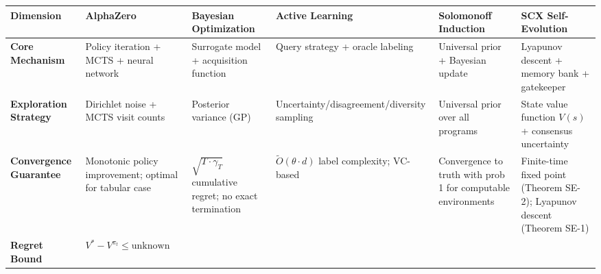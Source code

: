 \documentclass[
  12pt,
]{ctexart}
\begin{document}
\begin{longtable}[]{@{}
  >{\raggedright\arraybackslash}p{}
  >{\raggedright\arraybackslash}p{}
  >{\raggedright\arraybackslash}p{}
  >{\raggedright\arraybackslash}p{}
  >{\raggedright\arraybackslash}p{}
  >{\raggedright\arraybackslash}p{}@{}}
\toprule\noalign{}
\begin{minipage}[b]{\linewidth}\raggedright
Dimension
\end{minipage} & \begin{minipage}[b]{\linewidth}\raggedright
AlphaZero
\end{minipage} & \begin{minipage}[b]{\linewidth}\raggedright
Bayesian Optimization
\end{minipage} & \begin{minipage}[b]{\linewidth}\raggedright
Active Learning
\end{minipage} & \begin{minipage}[b]{\linewidth}\raggedright
Solomonoff Induction
\end{minipage} & \begin{minipage}[b]{\linewidth}\raggedright
SCX Self-Evolution
\end{minipage} \\
\midrule\noalign{}
\endhead
\bottomrule\noalign{}
\endlastfoot
\textbf{Core Mechanism} & Policy iteration + MCTS + neural network &
Surrogate model + acquisition function & Query strategy + oracle
labeling & Universal prior + Bayesian update & Lyapunov descent + memory
bank + gatekeeper \\
\textbf{Exploration Strategy} & Dirichlet noise + MCTS visit counts &
Posterior variance (GP) & Uncertainty/disagreement/diversity sampling &
Universal prior over all programs & State value function \(V(s)\) +
consensus uncertainty \\
\textbf{Convergence Guarantee} & Monotonic policy improvement; optimal
for tabular case & \(\sqrt{T \cdot \gamma_T}\) cumulative regret; no
exact termination & \(\tilde{O}(\theta \cdot d)\) label complexity;
VC-based & Convergence to truth with prob 1 for computable environments
& Finite-time fixed point (Theorem SE-2); Lyapunov descent (Theorem
SE-1) \\
\textbf{Regret Bound} & \(V^* - V^{\pi_t} \leq \text{unknown}\)

\end{longtable}
\end{document}

